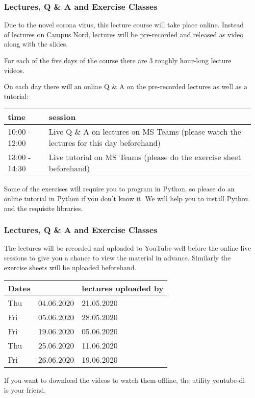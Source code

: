 \documentclass[10pt,aspectratio=169,dvipsnames]{beamer}
\begin{document}
\begin{frame}
  \frametitle{Lectures, Q \& A and Exercise Classes}

  Due to the novel corona virus, this lecture course will take place online. Instead of lectures on Campus Nord, lectures will be pre-recorded and released as video along with the slides.

  For each of the five days of the course there are 3 roughly hour-long lecture videos.

  On each day there will an online Q \& A on the pre-recorded lectures as well as a tutorial:


  \vspace{.2cm}
  \begin{tabular}{@{} p{3cm}p{8cm} @{}}
    \toprule
    time & session \\
    \midrule
    10:00 - 12:00 & Live Q \& A on lectures on MS Teams (please watch the lectures for this day beforehand) \\
    13:00 - 14:30 & Live tutorial on MS Teams (please do the exercise sheet beforehand)\\
    \bottomrule
  \end{tabular}
  \vspace{.2cm}
  \raggedright

  Some of the exercises will require you to program in Python, so please do an online tutorial in Python if you don't know it. We will help you to install Python and the
  requisite libraries.

\end{frame}


\begin{frame}
  \frametitle{Lectures, Q \& A and Exercise Classes}

  The lectures will be recorded and uploaded to YouTube well before the online live sessions to give you a chance to view the material in advance. Similarly the exercise sheets will be uploaded beforehand.

  \vspace{.2cm}

  \begin{tabular}{@{} p{0.7cm}p{3cm}p{5cm} @{}}
    \toprule
     Dates &   & lectures uploaded by \\
    \midrule
  Thu & 04.06.2020 & 21.05.2020 \\
  Fri & 05.06.2020 & 28.05.2020 \\
  Fri & 19.06.2020 & 05.06.2020 \\
  Thu & 25.06.2020 & 11.06.2020 \\
  Fri & 26.06.2020 & 19.06.2020 \\
 \bottomrule
  \end{tabular}

  \vspace{.2cm}

  If you want to download the videos to watch them offline, the utility youtube-dl is your friend.

\end{frame}
\end{document}
